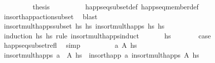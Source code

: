 \begin{isabellebody}
\ \ \ \ \ \ \isamarkupfalse%
\ \isamarkupfalse%
\ {\isacharquery}{\kern0pt}thesis\isanewline
\ \ \ \ \ \ \ \ \isamarkupfalse%
\ happ{\isacharunderscore}{\kern0pt}seq{\isacharunderscore}{\kern0pt}subset{\isacharunderscore}{\kern0pt}def\ happ{\isacharunderscore}{\kern0pt}seq{\isacharunderscore}{\kern0pt}member{\isacharunderscore}{\kern0pt}def\isanewline
\ \ \ \ \ \ \ \ \isamarkupfalse%
\ insort{\isacharunderscore}{\kern0pt}happ{\isacharunderscore}{\kern0pt}action{\isacharunderscore}{\kern0pt}subset\ \isamarkupfalse%
\ blast\isanewline
\ \ \ \ \isamarkupfalse%
\isanewline
\ \ \isamarkupfalse%
%
\endisatagproof
{\isafoldproof}%
%
\isadelimproof
\isanewline
%
\endisadelimproof
\isanewline
\ \ \isamarkupfalse%
\ insort{\isacharunderscore}{\kern0pt}mult{\isacharunderscore}{\kern0pt}happs{\isacharunderscore}{\kern0pt}subset{\isacharcolon}{\kern0pt}\ {\isachardoublequoteopen}hs\ {\isasymsubseteq}\isactrlsub h\isactrlsub s\ insort{\isacharunderscore}{\kern0pt}mult{\isacharunderscore}{\kern0pt}happs\ hs\ hs\isanewline
%
\isadelimproof
\ \ %
\endisadelimproof
%
\isatagproof
{}\isamarkupfalse%
\ {\isacharparenleft}{\kern0pt}induction\ hs\ hs\ rule{\isacharcolon}{\kern0pt}\ insort{\isacharunderscore}{\kern0pt}mult{\isacharunderscore}{\kern0pt}happs{\isachardot}{\kern0pt}induct{\isacharparenright}{\kern0pt}\isanewline
\ \ \ \ \isamarkupfalse%
\ {\isacharparenleft}{\kern0pt}{}\ hs{\isacharparenright}{\kern0pt}\isanewline
\ \ \ \ \isamarkupfalse%
\ \isamarkupfalse%
\ {\isacharquery}{\kern0pt}case\isanewline
\ \ \ \ \ \ \isamarkupfalse%
\ happ{\isacharunderscore}{\kern0pt}seq{\isacharunderscore}{\kern0pt}subset{\isacharunderscore}{\kern0pt}refl\ \isamarkupfalse%
\ simp\isanewline
\ \ \isamarkupfalse%
\isanewline
\ \ \ \ \isamarkupfalse%
\ {\isacharparenleft}{\kern0pt}{}\ a\ A\ hs{\isacharparenright}{\kern0pt}\isanewline
\ \ \ \ \isamarkupfalse%
\ {\isachardoublequoteopen}insort{\isacharunderscore}{\kern0pt}mult{\isacharunderscore}{\kern0pt}happs\ {\isacharparenleft}{\kern0pt}a\ {\isacharhash}{\kern0pt}\ A{\isacharparenright}{\kern0pt}\ hs\ {\isacharequal}{\kern0pt}\ insort{\isacharunderscore}{\kern0pt}happ\ a\ {\isacharparenleft}{\kern0pt}insort{\isacharunderscore}{\kern0pt}mult{\isacharunderscore}{\kern0pt}happs\ A\ hs{\isacharparenright}{\kern0pt}{\isachardoublequoteclose}\isanewline

\end{isabellebody}
